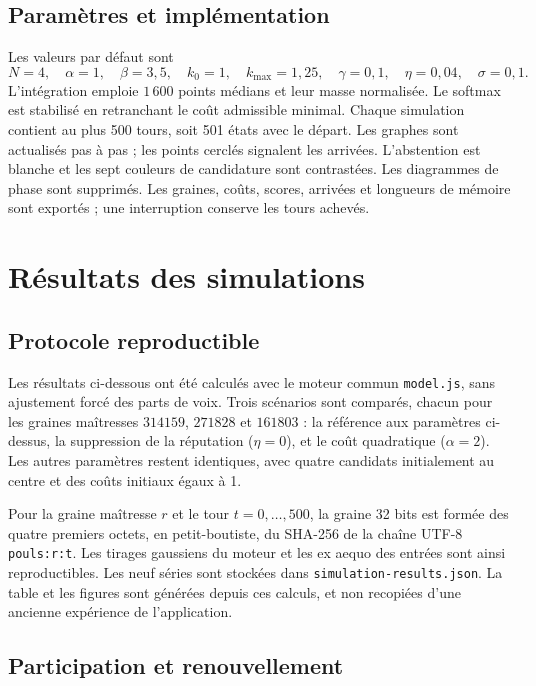 \documentclass[11pt,a4paper]{article}
\begin{document}
\subsection{Paramètres et implémentation}
Les valeurs par défaut sont
\[
N=4,\quad\alpha=1,\quad\beta=3{,}5,\quad k_0=1,\quad
k_{\max}=1{,}25,\quad\gamma=0{,}1,\quad\eta=0{,}04,\quad\sigma=0{,}1.
\]
L'intégration emploie $1\,600$ points médians et leur masse normalisée.
Le softmax est stabilisé en retranchant le coût admissible minimal.
Chaque simulation contient au plus 500 tours, soit 501 états avec le
départ. Les graphes sont actualisés pas à pas ; les points cerclés
signalent les arrivées. L'abstention est blanche et les sept couleurs
de candidature sont contrastées. Les diagrammes de phase sont supprimés.
Les graines, coûts, scores, arrivées et longueurs de mémoire sont
exportés ; une interruption conserve les tours achevés.

\section{Résultats des simulations}

\subsection{Protocole reproductible}
Les résultats ci-dessous ont été calculés avec le moteur commun
\texttt{model.js}, sans ajustement forcé des parts de voix.
Trois scénarios sont comparés, chacun pour les graines maîtresses
$314159$, $271828$ et $161803$ : la référence aux paramètres ci-dessus,
la suppression de la réputation ($\eta=0$), et le coût quadratique
($\alpha=2$). Les autres paramètres restent identiques, avec quatre
candidats initialement au centre et des coûts initiaux égaux à 1.

Pour la graine maîtresse $r$ et le tour $t=0,\ldots,500$, la graine
32 bits est formée des quatre premiers octets, en petit-boutiste, du
SHA-256 de la chaîne UTF-8 \texttt{pouls:r:t}. Les tirages gaussiens
du moteur et les ex aequo des entrées sont ainsi reproductibles.
Les neuf séries sont stockées dans \texttt{simulation-results.json}.
La table et les figures sont générées depuis ces calculs, et non
recopiées d'une ancienne expérience de l'application.

\subsection{Participation et renouvellement}

\end{document}
